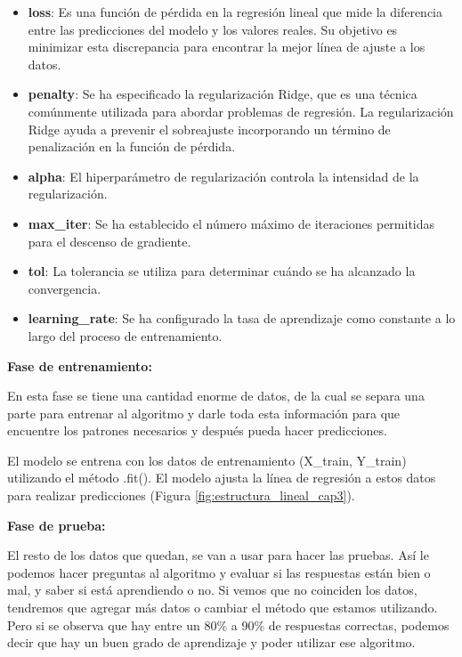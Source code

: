 \begin{itemize}
  \item \textbf{loss}: Es una función de pérdida en la regresión lineal que mide la diferencia entre las predicciones del modelo y los valores reales. Su objetivo es minimizar esta discrepancia para encontrar la mejor línea de ajuste a los datos.

  \item \textbf{penalty}: Se ha especificado la regularización Ridge, que es una técnica comúnmente utilizada para abordar problemas de regresión. La regularización Ridge ayuda a prevenir el sobreajuste incorporando un término de penalización en la función de pérdida.

  \item \textbf{alpha}: El hiperparámetro de regularización controla la intensidad de la regularización.

  \item \textbf{max\_iter}: Se ha establecido el número máximo de iteraciones permitidas para el descenso de gradiente.

  \item \textbf{tol}: La tolerancia se utiliza para determinar cuándo se ha alcanzado la convergencia.

  \item \textbf{learning\_rate}: Se ha configurado la tasa de aprendizaje como constante a lo largo del proceso de entrenamiento.
\end{itemize}

\textbf{Fase de entrenamiento:}

En esta fase se tiene una cantidad enorme de datos, de la cual se separa una
parte para entrenar al algoritmo y darle toda esta información para que
encuentre los patrones necesarios y después pueda hacer predicciones.

El modelo se entrena con los datos de entrenamiento (X\_train, Y\_train)
utilizando el método .fit(). El modelo ajusta la línea de regresión a estos
datos para realizar predicciones (Figura \ref{fig:estructura_lineal_cap3}).

\vspace{1\baselineskip}
\textbf{Fase de prueba:}

El resto de los datos que quedan, se van a usar para hacer las pruebas. Así le
podemos hacer preguntas al algoritmo y evaluar si las respuestas están bien o
mal, y saber si está aprendiendo o no. Si vemos que no coinciden los datos,
tendremos que agregar más datos o cambiar el método que estamos utilizando.
Pero si se observa que hay entre un 80\% a 90\% de respuestas correctas,
podemos decir que hay un buen grado de aprendizaje y poder utilizar ese
algoritmo.

